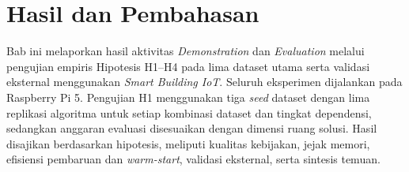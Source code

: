 \chapter{Hasil dan Pembahasan}

Bab ini melaporkan hasil aktivitas \textit{Demonstration} dan \textit{Evaluation} melalui pengujian empiris Hipotesis H1–H4 pada lima dataset utama serta validasi eksternal menggunakan \textit{Smart Building IoT}. 
Seluruh eksperimen dijalankan pada Raspberry Pi 5.
Pengujian H1 menggunakan tiga \textit{seed} dataset dengan lima replikasi algoritma untuk setiap kombinasi dataset dan tingkat dependensi, sedangkan anggaran evaluasi disesuaikan dengan dimensi ruang solusi.
Hasil disajikan berdasarkan hipotesis, meliputi kualitas kebijakan, jejak memori, efisiensi pembaruan dan \textit{warm-start}, validasi eksternal, serta sintesis temuan.





